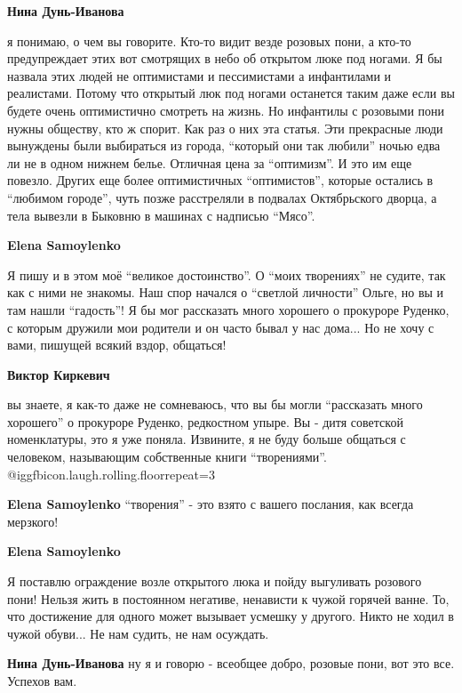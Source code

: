 \begin{itemize}
\begin{itemize}
\begin{itemize}
\textbf{Нина Дунь-Иванова} 

я понимаю, о чем вы говорите. Кто-то видит везде розовых пони, а кто-то
предупреждает этих вот смотрящих в небо об открытом люке под ногами. Я бы
назвала этих людей не оптимистами и пессимистами а инфантилами и реалистами.
Потому что открытый люк под ногами останется таким даже если вы будете очень
оптимистично смотреть на жизнь. Но инфантилы с розовыми пони нужны обществу,
кто ж спорит. Как раз о них эта статья. Эти прекрасные люди вынуждены были
выбираться из города, \enquote{который они так любили} ночью едва ли не в одном нижнем
белье. Отличная цена за \enquote{оптимизм}. И это им еще повезло. Других еще более
оптимистичных \enquote{оптимистов}, которые остались в \enquote{любимом городе}, чуть позже
расстреляли в подвалах Октябрьского дворца, а тела вывезли в Быковню в машинах
с надписью \enquote{Мясо}.

\textbf{Elena Samoylenko} 

Я пишу и в этом моё \enquote{великое достоинство}. О \enquote{моих творениях} не судите, так
как с ними не знакомы. Наш спор начался о \enquote{светлой личности} Ольге, но вы и там
нашли \enquote{гадость}! Я бы мог рассказать много хорошего о прокуроре Руденко, с
которым дружили мои родители и он часто бывал у нас дома... Но не хочу с вами,
пишущей всякий вздор, общаться!

\textbf{Виктор Киркевич} 

вы знаете, я как-то даже не сомневаюсь, что вы бы могли \enquote{рассказать
много хорошего} о прокуроре Руденко, редкостном упыре. Вы - дитя советской
номенклатуры, это я уже поняла. Извините, я не буду больше общаться с
человеком, называющим собственные книги \enquote{творениями}.
@igg{fbicon.laugh.rolling.floor}{repeat=3} 


\textbf{Elena Samoylenko} \enquote{творения} - это взято с вашего послания, как всегда мерзкого!

\textbf{Elena Samoylenko} 

Я поставлю ограждение возле открытого люка и пойду выгуливать розового пони!
Нельзя жить в постоянном негативе, ненависти к чужой горячей ванне. То, что
достижение для одного может вызывает усмешку у другого. Никто не ходил в чужой
обуви... Не нам судить, не нам осуждать.


\textbf{Нина Дунь-Иванова} ну я и говорю - всеобщее добро, розовые пони, вот это все. Успехов вам.
\end{itemize} %


\end{itemize}
\end{itemize}
